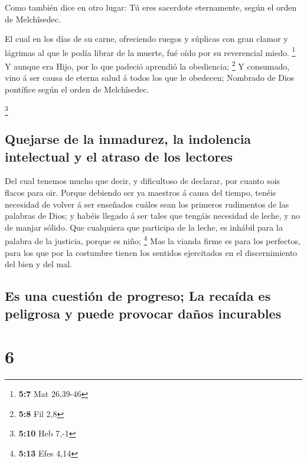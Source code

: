  Como también dice en otro lugar: Tú eres sacerdote
eternamente, según el orden de Melchîsedec.

 El cual en los días de su carne, ofreciendo ruegos y
súplicas con gran clamor y lágrimas al que le podía librar de la muerte,
fué oído por su reverencial miedo. \footnote{\textbf{5:7} Mat 26,39-46}
 Y aunque era Hijo, por lo que padeció aprendió la
obediencia; \footnote{\textbf{5:8} Fil 2,8}  Y consumado,
vino á ser causa de eterna salud á todos los que le obedecen;
 Nombrado de Dios pontífice según el orden de
Melchîsedec.

\footnote{\textbf{5:10} Heb 7,-1}

\hypertarget{quejarse-de-la-inmadurez-la-indolencia-intelectual-y-el-atraso-de-los-lectores}{%
\subsection{Quejarse de la inmadurez, la indolencia intelectual y el
atraso de los
lectores}\label{quejarse-de-la-inmadurez-la-indolencia-intelectual-y-el-atraso-de-los-lectores}}

 Del cual tenemos mucho que decir, y dificultoso de
declarar, por cuanto sois flacos para oir.  Porque
debiendo ser ya maestros á causa del tiempo, tenéis necesidad de volver
á ser enseñados cuáles sean los primeros rudimentos de las palabras de
Dios; y habéis llegado á ser tales que tengáis necesidad de leche, y no
de manjar sólido.  Que cualquiera que participa de la
leche, es inhábil para la palabra de la justicia, porque es niño;
\footnote{\textbf{5:13} Efes 4,14}  Mas la vianda firme
es para los perfectos, para los que por la costumbre tienen los sentidos
ejercitados en el discernimiento del bien y del mal.

\hypertarget{es-una-cuestiuxf3n-de-progreso-la-recauxedda-es-peligrosa-y-puede-provocar-dauxf1os-incurables}{%
\subsection{Es una cuestión de progreso; La recaída es peligrosa y puede
provocar daños
incurables}\label{es-una-cuestiuxf3n-de-progreso-la-recauxedda-es-peligrosa-y-puede-provocar-dauxf1os-incurables}}

\hypertarget{section-5}{%
\section{6}\label{section-5}}


